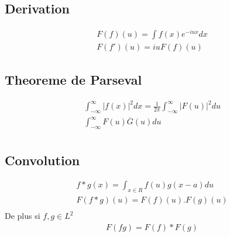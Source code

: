 \documentclass[a4paper,11pt]{article}
\begin{document}
\subsection{Derivation}
\begin{align*}
  F(f)(u) = \int f(x)e^{-iux} dx\\
  F(f')(u) = i u F(f)(u)
\end{align*}

\subsection{Theoreme de Parseval}

\begin{align*}
  \int_{-\infty}^{\infty} |f(x)|^2 dx = \frac{1}{2\pi} \int_{-\infty}^{\infty} |F(u)|^2 du\\
  \int_{-\infty}^{\infty} F(u)\overline{G}(u) du\\
\end{align*}

\subsection{Convolution}

\begin{align*}
  f * g(x) = \int_{x \in R} f(u) g(x - a) du\\
  F(f * g) (u) = F(f)(u) . F(g)(u)\\
\end{align*}
De plus si $f,g \in L^2$
\begin{align*}
  F(fg) = F(f) * F(g)
\end{align*}
\end{document}
